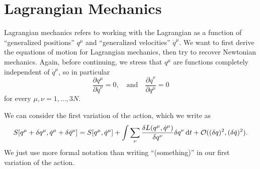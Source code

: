\section{Lagrangian Mechanics}

\M
Lagrangian mechanics refers to working with the Lagrangian as a function
of ``generalized positions'' $q^{\mu}$ and ``generalized velocities'' $\dot{q}^{\mu}$.
We want to first derive the equations of motion for Lagrangian
mechanics, then try to recover Newtonian mechanics. Again, before
continuing, we stress that $q^{\mu}$ are functions completely
independent of $\dot{q}^{\mu}$, so in particular
\begin{equation}
\frac{\partial q^{\mu}}{\partial\dot{q}^{\nu}}=0,\quad\mbox{and}\quad
\frac{\partial\dot{q}^{\nu}}{\partial q^{\mu}}=0
\end{equation}
for every $\mu,\nu=1,\dots,3N$.

We can consider the first variation of the action, which we write as
\begin{equation}
  S[q^{\mu} + \delta q^{\mu}, \dot{q}^{\mu} + \delta\dot{q}^{\mu}]
  =
  S[q^{\mu}, \dot{q}^{\mu}] + \int\sum_{\nu}\frac{\delta L(q^{\mu},
    \dot{q}^{\mu})}{\delta q^{\nu}}\delta q^{\nu}\,\mathrm{d} t +
  \mathcal{O}((\delta q)^{2},(\delta\dot{q})^{2}).
\end{equation}
We just use more formal notation than writing ``(something)'' in our
first variation of the action.

